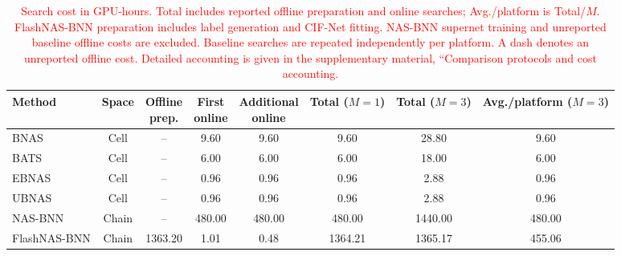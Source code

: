 \documentclass[a4paper,fleqn]{cas-sc}
\begin{document}
\begin{table}[ht]
\centering
\caption{\textcolor{red}{Search cost in GPU-hours. Total includes reported offline preparation and online searches; Avg./platform is Total/$M$. FlashNAS-BNN preparation includes label generation and CIF-Net fitting. NAS-BNN supernet training and unreported baseline offline costs are excluded. Baseline searches are repeated independently per platform. A dash denotes an unreported offline cost. Detailed accounting is given in the supplementary material, ``Comparison protocols and cost accounting.}}
\label{tab:search_cost}
\small
\setlength{\tabcolsep}{4pt}
\renewcommand{\arraystretch}{1.15}

{\color{red}
\begin{tabular}{l c c c c c c c}
\toprule[1.5pt]
Method & Space & \makecell{Offline\\prep.} & \makecell{First\\online} & \makecell{Additional\\online} & \makecell{Total\\($M=1$)} & \makecell{Total\\($M=3$)} & \makecell{Avg./platform\\($M=3$)} \\
\midrule
BNAS~\cite{Kim2020} & Cell & -- & 9.60 & 9.60 & 9.60 & 28.80 & 9.60 \\
BATS~\cite{Bulat2020} & Cell & -- & 6.00 & 6.00 & 6.00 & 18.00 & 6.00 \\
EBNAS~\cite{Shi2023} & Cell & -- & 0.96 & 0.96 & 0.96 & 2.88 & 0.96 \\
UBNAS~\cite{tan2024universal} & Cell & -- & 0.96 & 0.96 & 0.96 & 2.88 & 0.96 \\
\midrule
NAS-BNN~\cite{Lin2025} & Chain & -- & 480.00 & 480.00 & 480.00 & 1440.00 & 480.00 \\
\midrule
\rowcolor{gray!20}
FlashNAS-BNN & Chain & 1363.20 & 1.01 & 0.48 & 1364.21 & 1365.17 & 455.06 \\
\bottomrule[1.5pt]
\end{tabular}
}
\end{table}
\end{document}
